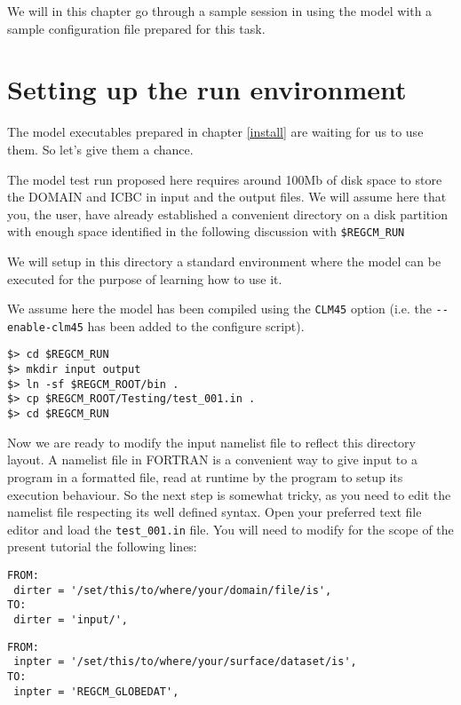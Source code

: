 %
%

We will in this chapter go through a sample session in using the model with
a sample configuration file prepared for this task.

\section{Setting up the run environment}

The model executables prepared in chapter \ref{install} are waiting for us to
use them. So let's give them a chance.

The model test run proposed here requires around 100Mb of disk space to store
the DOMAIN and ICBC in input and the output files. We will assume here that you,
the user, have already established a convenient directory on a disk partition
with enough space identified in the following discussion with \verb=$REGCM_RUN=

We will setup in this directory a standard environment where the model can be
executed for the purpose of learning how to use it.

We assume here the model has been compiled using the \verb=CLM45= option (i.e.
the \verb=--enable-clm45= has been added to the configure script).

\begin{Verbatim}
$> cd $REGCM_RUN
$> mkdir input output
$> ln -sf $REGCM_ROOT/bin .
$> cp $REGCM_ROOT/Testing/test_001.in .
$> cd $REGCM_RUN
\end{Verbatim}

Now we are ready to modify the input namelist file to reflect this directory
layout. A namelist file in FORTRAN is a convenient way to give input to a
program in a formatted file, read at runtime by the program to setup its
execution behaviour. So the next step is somewhat tricky, as you need to edit
the namelist file respecting its well defined syntax. Open your preferred text
file editor and load the \verb=test_001.in= file. You will need to modify for
the scope of the present tutorial the following lines:

\begin{Verbatim}
FROM:
 dirter = '/set/this/to/where/your/domain/file/is',
TO:
 dirter = 'input/',
\end{Verbatim}

\begin{Verbatim}
FROM:
 inpter = '/set/this/to/where/your/surface/dataset/is',
TO:
 inpter = 'REGCM_GLOBEDAT',
\end{Verbatim}

